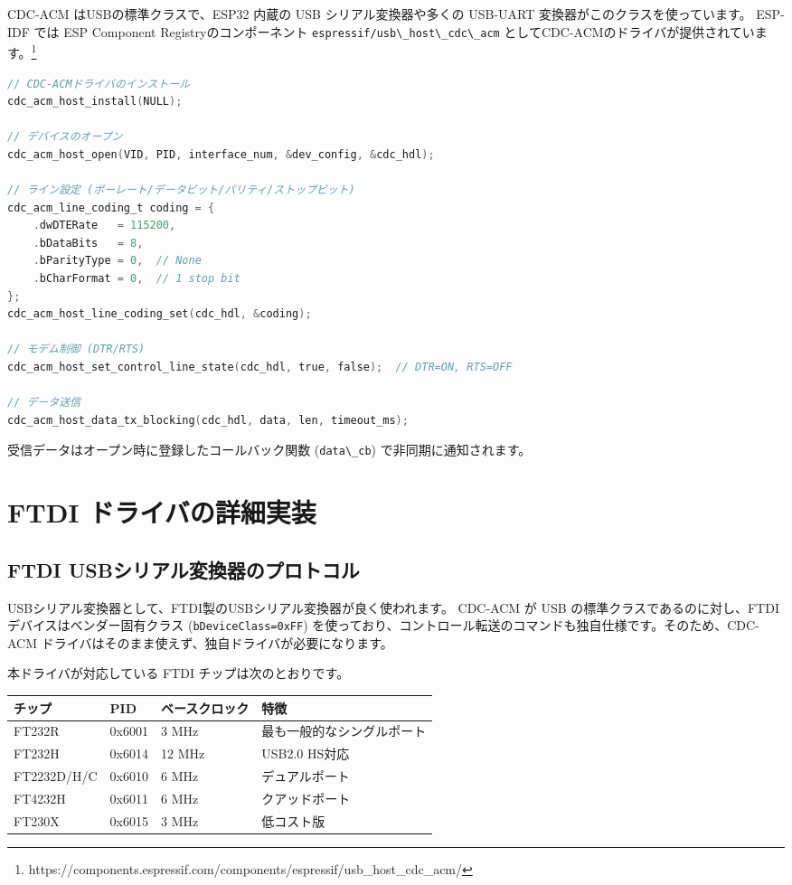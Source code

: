 \documentclass[10pt,twoside,openany,a4j]{ltjsbook}
\newcommand{\passthrough}[1]{#1}
\begin{document}
CDC-ACM はUSBの標準クラスで、ESP32 内蔵の USB シリアル変換器や多くの
USB-UART 変換器がこのクラスを使っています。 ESP-IDF では ESP Component
Registryのコンポーネント
\passthrough{\lstinline!espressif/usb\_host\_cdc\_acm!}
としてCDC-ACMのドライバが提供されています。\footnote{https://components.espressif.com/components/espressif/usb\_host\_cdc\_acm/}

\begin{lstlisting}[language=C]
// CDC-ACMドライバのインストール
cdc_acm_host_install(NULL);

// デバイスのオープン
cdc_acm_host_open(VID, PID, interface_num, &dev_config, &cdc_hdl);

// ライン設定 (ボーレート/データビット/パリティ/ストップビット)
cdc_acm_line_coding_t coding = {
    .dwDTERate   = 115200,
    .bDataBits   = 8,
    .bParityType = 0,  // None
    .bCharFormat = 0,  // 1 stop bit
};
cdc_acm_host_line_coding_set(cdc_hdl, &coding);

// モデム制御 (DTR/RTS)
cdc_acm_host_set_control_line_state(cdc_hdl, true, false);  // DTR=ON, RTS=OFF

// データ送信
cdc_acm_host_data_tx_blocking(cdc_hdl, data, len, timeout_ms);
\end{lstlisting}

受信データはオープン時に登録したコールバック関数
(\passthrough{\lstinline!data\_cb!}) で非同期に通知されます。

\chapter{FTDI
ドライバの詳細実装}\label{ftdi-ux30c9ux30e9ux30a4ux30d0ux306eux8a73ux7d30ux5b9fux88c5}

\section{FTDI
USBシリアル変換器のプロトコル}\label{ftdi-usbux30b7ux30eaux30a2ux30ebux5909ux63dbux5668ux306eux30d7ux30edux30c8ux30b3ux30eb}

USBシリアル変換器として、FTDI製のUSBシリアル変換器が良く使われます。
CDC-ACM が USB の標準クラスであるのに対し、FTDI
デバイスはベンダー固有クラス
(\passthrough{\lstinline!bDeviceClass=0xFF!})
を使っており、コントロール転送のコマンドも独自仕様です。そのため、CDC-ACM
ドライバはそのまま使えず、独自ドライバが必要になります。

本ドライバが対応している FTDI チップは次のとおりです。

\begin{longtable}[]{@{}llll@{}}
\toprule\noalign{}
チップ & PID & ベースクロック & 特徴 \\
\midrule\noalign{}
\endhead
\bottomrule\noalign{}
\endlastfoot
FT232R & 0x6001 & 3 MHz & 最も一般的なシングルポート \\
FT232H & 0x6014 & 12 MHz & USB2.0 HS対応 \\
FT2232D/H/C & 0x6010 & 6 MHz & デュアルポート \\
FT4232H & 0x6011 & 6 MHz & クアッドポート \\
FT230X & 0x6015 & 3 MHz & 低コスト版 \\
\end{longtable}
\end{document}
